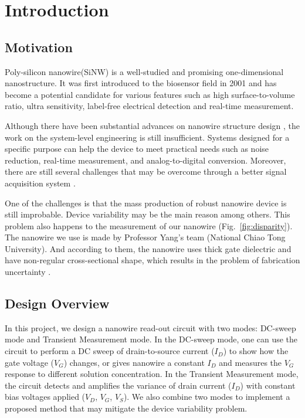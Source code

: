 \chapter{Introduction}
\section{Motivation}
Poly-silicon nanowire(SiNW) is a well-studied and promising one-dimensional nanostructure.
It was first introduced to the biosensor field in 2001\cite{C2001} and has become a potential candidate for various features such as high surface-to-volume ratio, ultra sensitivity, label-free electrical detection and real-time measurement.

Although there have been substantial advances on nanowire structure design \cite{R1}, the work on the system-level engineering is still insufficient.
Systems designed for a specific purpose can help the device to meet practical needs such as noise reduction, real-time measurement, and analog-to-digital conversion.
Moreover, there are still several challenges that may be overcome through a better signal acquisition system \cite{R1}.

One of the challenges is that the mass production of robust nanowire device is still improbable.
Device variability may be the main reason among others.
This problem also happens to the measurement of our nanowire (Fig.~\ref{fig:disparity}).
The nanowire we use is made by Professor Yang's team (National Chiao Tong University).
And according to them, the nanowire uses thick gate dielectric and have non-regular cross-sectional shape, which results in the problem of fabrication uncertainty \cite{C6}.


\section{Design Overview}
In this project, we design a nanowire read-out circuit with two modes: DC-sweep mode and Transient Measurement mode.
In the DC-sweep mode, one can use the circuit to perform a DC sweep of drain-to-source current ($I_D$) to show how the gate voltage ($V_G$) changes, or gives nanowire a constant $I_D$ and measures the $V_{G}$ response to different solution concentration.
In the Transient Measurement mode, the circuit detects and amplifies the variance of drain current ($I_D$) with constant bias voltages applied ($V_D$, $V_G$, $V_S$).
We also combine two modes to implement a proposed method that may mitigate the device variability problem.

